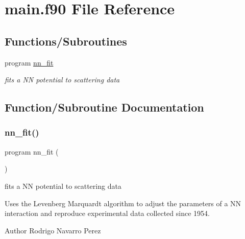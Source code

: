 \hypertarget{main_8f90}{}\section{main.\+f90 File Reference}
\label{main_8f90}
\subsection*{Functions/\+Subroutines}
\begin{DoxyCompactItemize}
\item 
program \hyperlink{main_8f90_a6a795ff6f0a25ccd68c72837111c85a9}{nn\+\_\+fit}
\begin{DoxyCompactList}\small\item\em fits a NN potential to scattering data \end{DoxyCompactList}\end{DoxyCompactItemize}


\subsection{Function/\+Subroutine Documentation}
\mbox{\label{main_8f90_a6a795ff6f0a25ccd68c72837111c85a9}} 
\subsubsection{\texorpdfstring{nn\+\_\+fit()}{nn\_fit()}}
{\footnotesize\ttfamily program nn\+\_\+fit (\begin{DoxyParamCaption}{ }\end{DoxyParamCaption})}



fits a NN potential to scattering data 

Uses the Levenberg Marquardt algorithm to adjust the parameters of a NN interaction and reproduce experimental data collected since 1954.

\begin{DoxyAuthor}{Author}
Rodrigo Navarro Perez 
\end{DoxyAuthor}
